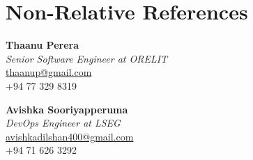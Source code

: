 \section{Non-Relative References}
  \begin{minipage}[t]{0.48\textwidth}
    \textbf{Thaanu Perera}\\
    \textit{Senior Software Engineer at ORELIT}\\
    \href{mailto:thaanup@gmail.com}{thaanup@gmail.com}\\
    +94 77 329 8319
  \end{minipage}
  \hfill
  \begin{minipage}[t]{0.48\textwidth}
    \textbf{Avishka Sooriyapperuma}\\
    \textit{DevOps Engineer at LSEG}\\
    \href{mailto:avishkadilshan400@gmail.com}{avishkadilshan400@gmail.com}\\
    +94 71 626 3292
  \end{minipage}
